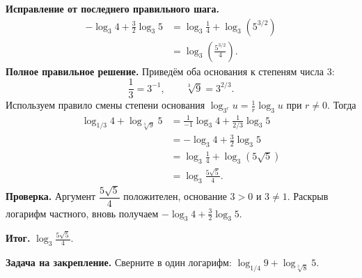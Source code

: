 \documentclass[a4paper,12pt]{article}
\newcommand{\result}{\textcolor{darkaccent}{\textbf{Итог.}}}
\begin{document}
\textbf{Исправление от последнего правильного шага.}
\begin{align*}
-\log_3 4+\frac32\log_3 5
 &=\log_3\frac14+\log_3\left(5^{3/2}\right)\\
 &=\log_3\left(\frac{5^{3/2}}4\right).
\end{align*}
\textbf{Полное правильное решение.} Приведём оба основания к степеням числа $3$:
\[
\frac13=3^{-1},\qquad \sqrt[3]{9}=3^{2/3}.
\]
Используем правило смены степени основания $\log_{3^r}u=\frac1r\log_3 u$ при $r\ne0$. Тогда
\begin{align*}
\log_{1/3}4+\log_{\sqrt[3]{9}}5
 &=\frac1{-1}\log_3 4+\frac1{2/3}\log_3 5\\
 &=-\log_3 4+\frac32\log_3 5\\
 &=\log_3\frac14+\log_3\left(5\sqrt5\right)\\
 &=\log_3\frac{5\sqrt5}{4}.
\end{align*}
\textbf{Проверка.} Аргумент $\dfrac{5\sqrt5}{4}$ положителен, основание $3>0$ и $3\ne1$. Раскрыв логарифм частного, вновь получаем $-\log_3 4+\tfrac32\log_3 5$.

\result{} $\boxed{\displaystyle\log_3\frac{5\sqrt5}{4}}$.

\vspace{3mm}
\textbf{Задача на закрепление.} Сверните в один логарифм:
$\log_{1/4}9+\log_{\sqrt[3]{8}}5$.
\endgroup
\end{document}
